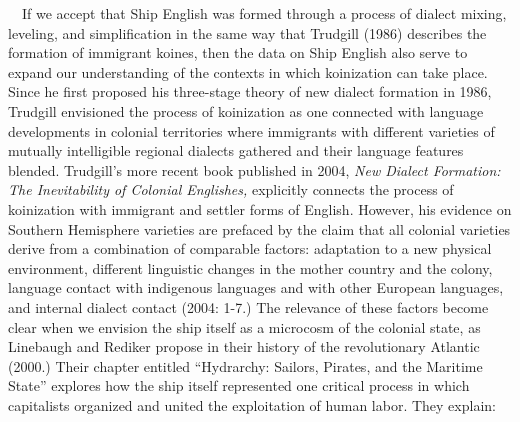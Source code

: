 \documentclass[12pt]{article}
\newenvironment{styleStandard}{\renewcommand\baselinestretch{1.0}\setlength\leftskip{0cm}\setlength\rightskip{0cm plus 1fil}\setlength\parindent{0cm}\setlength\parfillskip{0pt plus 1fil}\setlength\parskip{0in plus 1pt}\writerlistparindent\writerlistleftskip\leavevmode\normalfont\normalsize\writerlistlabel\ignorespaces}{\unskip\vspace{0in plus 1pt}\par}
\newcommand\writerlistleftskip{}
\newcommand\writerlistparindent{}
\newcommand\writerlistlabel{}
\begin{document}
\begin{styleStandard}
\ \ If we accept that Ship English was formed through a process of dialect mixing, leveling, and simplification in the same way that Trudgill (1986) describes the formation of immigrant koines, then the data on Ship English also serve to expand our understanding of the contexts in which koinization can take place. Since he first proposed his three-stage theory of new dialect formation in 1986, Trudgill envisioned the process of koinization as one connected with language developments in colonial territories where immigrants with different varieties of mutually intelligible regional dialects gathered and their language features blended. Trudgill’s more recent book published in 2004, \textit{New Dialect Formation: The Inevitability of Colonial Englishes,} explicitly connects the process of koinization with immigrant and settler forms of English. However, his evidence on Southern Hemisphere varieties are prefaced by the claim that all colonial varieties derive from a combination of comparable factors: adaptation to a new physical environment, different linguistic changes in the mother country and the colony, language contact with indigenous languages and with other European languages, and internal dialect contact (2004: 1-7.) The relevance of these factors become clear when we envision the ship itself as a microcosm of the colonial state, as Linebaugh and Rediker propose in their history of the revolutionary Atlantic (2000.) Their chapter entitled “Hydrarchy: Sailors, Pirates, and the Maritime State” explores how the ship itself represented one critical process in which capitalists organized and united the exploitation of human labor. They explain:
\end{styleStandard}
\end{document}
